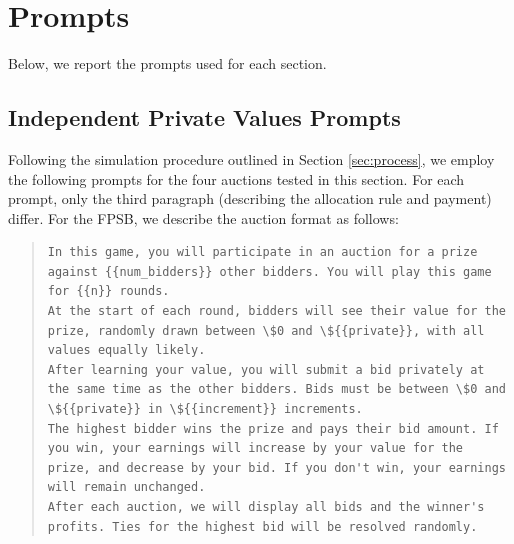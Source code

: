 \documentclass{article} %
\begin{document}

\section{Prompts}
Below, we report the prompts used for each section. 

\subsection{Independent Private Values Prompts}\label{sec:ipv-prompts}
Following the simulation procedure outlined in Section \ref{sec:process}, we employ the following prompts for the four auctions tested in this section. For each prompt, only the third paragraph (describing the allocation rule and payment) differ. For the FPSB, we describe the auction format as follows:
\begin{quote}
\begin{lstlisting}[basicstyle=\ttfamily, breaklines=true]
In this game, you will participate in an auction for a prize against {{num_bidders}} other bidders. You will play this game for {{n}} rounds.
At the start of each round, bidders will see their value for the prize, randomly drawn between \$0 and \${{private}}, with all values equally likely.
After learning your value, you will submit a bid privately at the same time as the other bidders. Bids must be between \$0 and \${{private}} in \${{increment}} increments.
The highest bidder wins the prize and pays their bid amount. If you win, your earnings will increase by your value for the prize, and decrease by your bid. If you don't win, your earnings will remain unchanged.
After each auction, we will display all bids and the winner's profits. Ties for the highest bid will be resolved randomly.
\end{lstlisting}
\end{quote}
\end{document}
